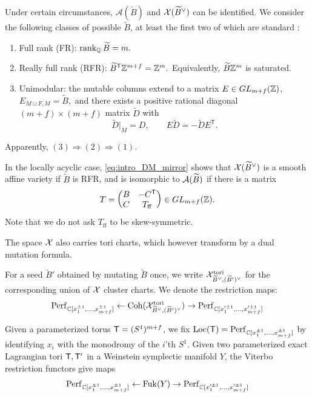 \documentclass[12pt, letter]{amsart}
\DeclareMathOperator{\Fuk}{Fuk}
\theoremstyle{definition}
\begin{document}
Under certain circumstances,  $\mathcal{A}(\widetilde B)$ and $\mathcal{X}(\widetilde B^\vee)$ can be identified.  We consider the following classes of possible $\widetilde{B}$, at least the first two of which are standard \cite{GLSB}: 
\begin{enumerate}
    \item Full rank (FR):
    \(
        \operatorname{rank}_{\mathbb{Q}}\widetilde B = m.
    \)
    \item Really full rank (RFR):
    \(
        \widetilde B^{\mathsf T}\mathbb{Z}^{m+f}=\mathbb{Z}^m.
    \)
    Equivalently, $\widetilde B \mathbb{Z}^m$ is saturated.

    \item Unimodular: the mutable columns extend to a matrix
    \(E\in GL_{m+f}(\mathbb{Z}) \),
    \(    E_{M\sqcup F,M}=\widetilde B, \)
    and there exists a positive rational diagonal $(m+f) \times (m+f)$ matrix
    $\widetilde D$ with
    \[
        \widetilde D|_M=D,\qquad
        E\widetilde D=-\widetilde D E^{\mathsf T}.
    \]
\end{enumerate}
Apparently, \( (3) \Rightarrow (2) \Rightarrow (1)\).



In the locally acyclic case, \eqref{eq:intro_DM_mirror}  shows that \(\mathcal{X}(\widetilde B^\vee)\) is a smooth affine variety if \(\widetilde B\) is RFR, and is isomorphic to \(\mathcal{A}(\widetilde B)\) if there is a matrix 
\[
    T =
    \begin{pmatrix}
        B&-C^{\mathsf T}\\
        C &T_{\mathrm{ff}}
    \end{pmatrix}
    \in GL_{m+f}(\mathbb{Z}).
    \]
 Note that we do not ask \(T_\mathrm{ff}\) to be skew-symmetric. 

The space $\mathcal{X}$ also carries tori charts, which however transform by a dual mutation formula. 




For a seed $\widetilde B'$ obtained by mutating $\widetilde B$ once, we write $\mathcal{X}^{\mathrm{tori}}_{\widetilde B^\vee, (\widetilde B')^\vee}$ for the corresponding union of $\mathcal{X}$ cluster charts.  We denote the restriction maps:
\begin{equation} \label{eq: one mutation X comparison}
\mathrm{Perf}_{\mathbb C[x_1^{\pm1}, \ldots, x_{m+f}^{\pm1}]} \leftarrow \operatorname{Coh}(\mathcal{X}^{\mathrm{tori}}_{\widetilde{B}^\vee, (\widetilde{B}')^\vee}) \rightarrow \mathrm{Perf}_{\mathbb C[x_1'^{\pm1}, \ldots, x_{m+f}'^{\pm1}]} 
\end{equation}


Given a parameterized torus $\mathsf T = (S^1)^{m+f}$, we fix $\operatorname{Loc}(\mathsf T) = \mathrm{Perf}_{\mathbb C[x_1^{\pm1}, \ldots, x_{m+f}^{\pm1}]}$ by identifying $x_i$ with the monodromy of the $i$'th $S^1$.  
Given two parameterized exact Lagrangian tori $\mathsf T, \mathsf T'$ in a Weinstein symplectic manifold $Y$, the Viterbo restriction functors give maps 
\begin{equation} \label{eq: lagrangian cluster comparison}
\Perf_{\C[x_1^{\pm1}, \ldots, x_{m+f}^{\pm1}]} \leftarrow \Fuk(Y) \rightarrow \Perf_{\C[x_1'^{\pm1}, \ldots, x_{m+f}'^{\pm1}]} \end{equation} 
\end{document}
